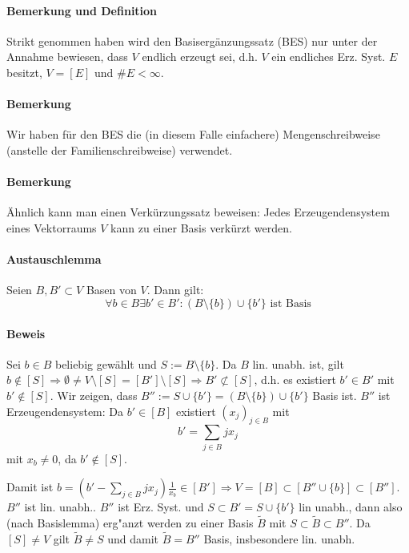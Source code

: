 \paragraph{Bemerkung und Definition}
    Strikt genommen haben wird den Basisergänzungssatz (BES) nur unter der Annahme bewiesen, dass $V$ endlich erzeugt sei, d.h. $V$ ein endliches Erz. Syst. $E$ besitzt, $V=[E]$ und $\#E<\infty$.
\paragraph{Bemerkung}
    Wir haben für den BES die (in diesem Falle einfachere) Mengenschreibweise (anstelle der Familienschreibweise) verwendet.
\paragraph{Bemerkung}
    Ähnlich kann man einen Verkürzungssatz beweisen: Jedes Erzeugendensystem eines Vektorraums $V$ kann zu einer Basis verkürzt werden.

\paragraph{Austauschlemma}
    Seien $B,B' \subset V$ Basen von $V$. Dann gilt:
    \begin{equation*}
        \forall b\in B \exists b' \in B': (B\setminus\{b\})\cup\{b'\} \text{ ist Basis}
    \end{equation*}
    
\paragraph{Beweis}
    Sei $b\in B$ beliebig gewählt und $S:= B\setminus \{b\}$. Da $B$ lin. unabh. ist, gilt $b\notin [S] \Rightarrow \emptyset \neq V\setminus [S] = [B']\setminus [S] \Rightarrow B' \not\subset [S]$, d.h. es existiert $b' \in B'$ mit $b' \notin [S]$. Wir zeigen, dass $B'' := S\cup \{b'\} = (B\setminus\{b\})\cup \{b'\}$ Basis ist. $B''$ ist Erzeugendensystem: Da $b'\in [B]$ existiert $(x_j)_{j\in B}$ mit $$b' = \sum_{j\in B} jx_j $$ mit $x_b \neq 0$, da $b' \notin [S]$.

    Damit ist $b=(b'-\sum_{j\in B} jx_j)\frac{1}{x_b} \in [B'] \Rightarrow V = [B] \subset [B'' \cup \{b\}] \subset [B'']$.
    $B''$ ist lin. unabh.. $B''$ ist Erz. Syst. und $S\subset B' = S \cup \{b'\}$ lin unabh., dann also (nach Basislemma) erg"anzt werden zu einer Basis $\tilde{B}$ mit $S\subset \tilde{B}\subset B''$.
    Da $[S] \neq V$ gilt $\tilde{B} \neq S$ und damit $\tilde{B} = B''$ Basis, insbesondere lin. unabh.
    
